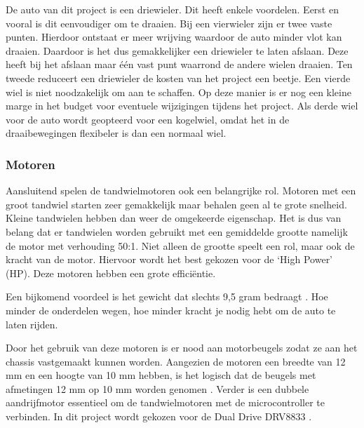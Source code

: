 \documentclass[a4paper,twoside,kulak]{kulakreport} %
\begin{document}
De auto van dit project is een driewieler. Dit heeft enkele voordelen. Eerst en vooral is dit eenvoudiger om te draaien. Bij een vierwieler zijn er twee vaste punten. Hierdoor ontstaat er meer wrijving waardoor de auto minder vlot kan draaien. Daardoor is het dus gemakkelijker een driewieler te laten afslaan. Deze heeft bij het afslaan maar één vast punt waarrond de andere wielen draaien. 
Ten tweede reduceert een driewieler de kosten van het project een beetje. Een vierde wiel is niet noodzakelijk om aan te schaffen. Op deze manier is er nog een kleine marge in het budget voor eventuele wijzigingen tijdens het project. Als derde wiel voor de auto wordt geopteerd voor een kogelwiel, omdat het in de draaibewegingen flexibeler is dan een normaal wiel.
\label{Wielen}


\subsubsection{Motoren}
Aansluitend spelen de tandwielmotoren ook een belangrijke rol. Motoren met een groot tandwiel starten zeer gemakkelijk maar behalen geen al te grote snelheid. Kleine tandwielen hebben dan weer de omgekeerde eigenschap. Het is dus van belang dat er tandwielen worden gebruikt met een gemiddelde grootte namelijk de motor met verhouding 50:1. Niet alleen de grootte speelt een rol, maar ook de kracht van de motor. Hiervoor wordt het best gekozen voor de `High Power' (HP). Deze motoren hebben een grote efficiëntie. 

Een bijkomend voordeel is het gewicht dat slechts 9,5 gram bedraagt \cite{MicroMetalGearMotor50:1HP}. %
Hoe minder de onderdelen wegen, hoe minder kracht je nodig hebt om de auto te laten rijden. 

Door het gebruik van deze motoren is er nood aan motorbeugels zodat ze aan het chassis vastgemaakt kunnen worden. Aangezien de motoren een breedte van 12 mm en een hoogte van 10 mm hebben, is het logisch dat de beugels met afmetingen 12 mm op 10 mm worden genomen \cite{MicroMetalGearMotorBeugel}.
Verder is een dubbele aandrijfmotor essentieel om de tandwielmotoren met de microcontroller te verbinden. In dit project wordt gekozen voor de Dual Drive DRV8833 \cite{DualDriveDRV8833}. 
\label{Motoren}
\end{document}
